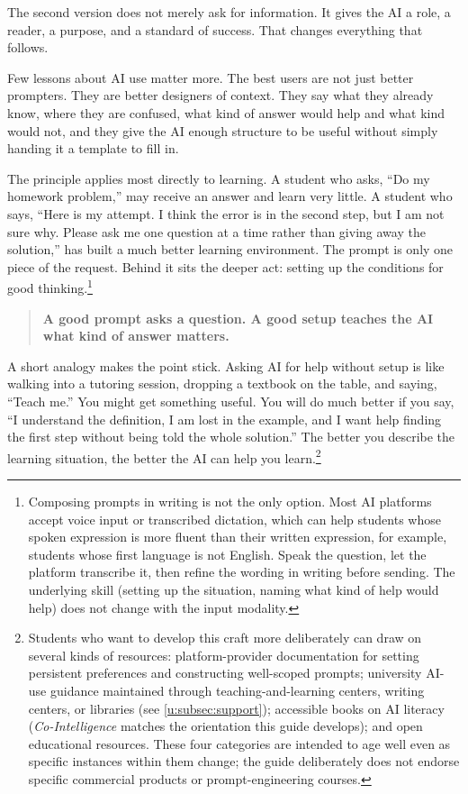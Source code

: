 \documentclass{SIAMbook2023}
\begin{document}
The second version does not merely ask for information. It gives the AI a role, a reader, a purpose, and a standard of success. That changes everything that follows.

Few lessons about AI use matter more. The best users are not just better prompters. They are better designers of context. They say what they already know, where they are confused, what kind of answer would help and what kind would not, and they give the AI enough structure to be useful without simply handing it a template to fill in.

The principle applies most directly to learning. A student who asks, ``Do my homework problem,'' may receive an answer and learn very little. A student who says, ``Here is my attempt. I think the error is in the second step, but I am not sure why. Please ask me one question at a time rather than giving away the solution,'' has built a much better learning environment. The prompt is only one piece of the request. Behind it sits the deeper act: setting up the conditions for good thinking.\footnote{Composing prompts in writing is not the only option. Most AI platforms accept voice input or transcribed dictation, which can help students whose spoken expression is more fluent than their written expression, for example, students whose first language is not English. Speak the question, let the platform transcribe it, then refine the wording in writing before sending. The underlying skill (setting up the situation, naming what kind of help would help) does not change with the input modality.}

\begin{quote}
\textbf{A good prompt asks a question. A good setup teaches the AI what kind of answer matters.}
\end{quote}

A short analogy makes the point stick. Asking AI for help without setup is like walking into a tutoring session, dropping a textbook on the table, and saying, ``Teach me.'' You might get something useful. You will do much better if you say, ``I understand the definition, I am lost in the example, and I want help finding the first step without being told the whole solution.'' The better you describe the learning situation, the better the AI can help you learn.\footnote{Students who want to develop this craft more deliberately can draw on several kinds of resources: platform-provider documentation for setting persistent preferences and constructing well-scoped prompts; university AI-use guidance maintained through teaching-and-learning centers, writing centers, or libraries (see \cref{u:subsec:support}); accessible books on AI literacy (\emph{Co-Intelligence} \citep{mollick2024cointelligence} matches the orientation this guide develops); and open educational resources. These four categories are intended to age well even as specific instances within them change; the guide deliberately does not endorse specific commercial products or prompt-engineering courses.}
\end{document}
